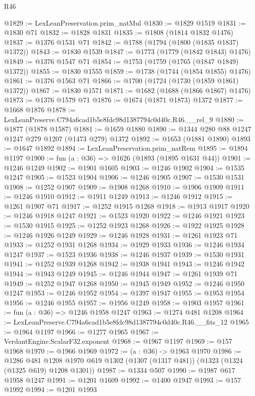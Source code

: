 \begin{lexlean}{R46}
\begin{coremodule}
@1829 := LexLeanPreservation.prim_natMul
@1830 := @1829 @1519
@1831 := @1830 @71
@1832 := @1828 @1831
@1835 := @1808 (@1814 @1832 @1476)
@1837 := @1376 @1531 @71
@1842 := @1788 (@1794 (@1800 (@1835 @1837) @1372))
@1843 := @1830 @1539
@1847 := @1773 (@1779 (@1842 @1843) @1476)
@1849 := @1376 @1547 @71
@1854 := @1753 (@1759 (@1765 (@1847 @1849) @1372))
@1855 := @1830 @1555
@1859 := @1738 (@1744 (@1854 @1855) @1476)
@1861 := @1376 @1563 @71
@1866 := @1700 (@1724 (@1730 (@1859 @1861) @1372))
@1867 := @1830 @1571
@1871 := @1682 (@1688 (@1866 @1867) @1476)
@1873 := @1376 @1579 @71
@1876 := @1674 (@1871 @1873) @1372
@1877 := @1668 @1876
@1878 := LexLeanPreserve.C794a6cad1b5e8fdc98d1387794c0d40c.R46.__rel_9
@1880 := @1877 (@1878 @1587)
@1881 := @1659 @1880
@1890 := @1344 @280 @88 @1247 @1247 @279 @1207 (@1473 @279) @1372
@1892 := @1653 (@1881 @1890)
@1893 := @1647 @1892
@1894 := LexLeanPreservation.prim_natRem
@1895 := @1894 @1197
@1900 := fun (a : @36) => @1626 (@1893 (@1895 @1631 @44))
@1901 := @1246 @1249
@1902 := @1901 @1605
@1903 := @1246 @1902
@1904 := @1535 @1247
@1905 := @1523 @1904
@1906 := @1246 @1905
@1907 := @1530 @1531
@1908 := @1252 @1907
@1909 := @1908 @1268
@1910 := @1906 @1909
@1911 := @1246 @1910
@1912 := @1911 @1249
@1913 := @1246 @1912
@1915 := @1261 @1907 @71
@1917 := @1252 @1915 @1268
@1918 := @1913 @1917
@1920 := @1246 @1918 @1247
@1921 := @1523 @1920
@1922 := @1246 @1921
@1923 := @1530 @1915
@1925 := @1252 @1923 @1268
@1926 := @1922 @1925
@1928 := @1246 @1926 @1249
@1929 := @1246 @1928
@1931 := @1261 @1923 @71
@1933 := @1252 @1931 @1268
@1934 := @1929 @1933
@1936 := @1246 @1934 @1247
@1937 := @1523 @1936
@1938 := @1246 @1937
@1939 := @1530 @1931
@1941 := @1252 @1939 @1268
@1942 := @1938 @1941
@1943 := @1246 @1942
@1944 := @1943 @1249
@1945 := @1246 @1944
@1947 := @1261 @1939 @71
@1949 := @1252 @1947 @1268
@1950 := @1945 @1949
@1952 := @1246 @1950 @1247
@1953 := @1246 @1952
@1954 := @1397 @1947
@1955 := @1953 @1954
@1956 := @1246 @1955
@1957 := @1956 @1249
@1958 := @1903 @1957
@1961 := fun (a : @36) => @1246 @1958 @1247
@1963 := @1274 @481 @1208
@1964 := LexLeanPreserve.C794a6cad1b5e8fdc98d1387794c0d40c.R46.__fits_12
@1965 := @1964 @1197
@1966 := @1277 @1965
@1967 := VerdantEngine.ScalarF32.exponent
@1968 := @1967 @1197
@1969 := @157 @1968
@1970 := @1966 @1969
@1972 := (a : @36) -> @1963 @1970
@1986 := @1286
    @481
    @1208
    @1970
    @619
    @1302
    (@1307 (@1317 @481))
    (@1323 (@1324 (@1325 @619) @1208 @1301))
@1987 := @1334 @507
@1990 := @1987 @617 @1958 @1247
@1991 := @1201 @1609
@1992 := @1400 @1947
@1993 := @157 @1992
@1994 := @1201 @1993

\end{coremodule}
\end{lexlean}
